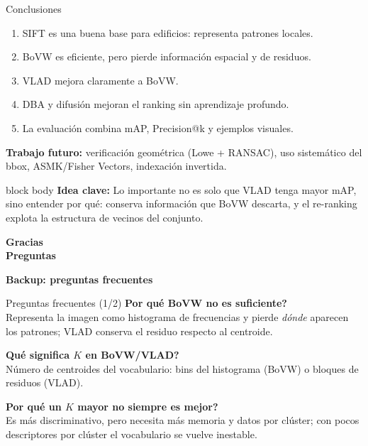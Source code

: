 \documentclass[aspectratio=169]{beamer}
\newcommand{\ideaclave}[1]{%
  \vfill
  \begin{beamercolorbox}[wd=\textwidth,sep=0.35em]{block body}
    \small\textbf{Idea clave:} #1
  \end{beamercolorbox}
}
\begin{document}
\begin{frame}{Conclusiones}
  \begin{enumerate}
    \item SIFT es una buena base para edificios: representa patrones locales.
    \item BoVW es eficiente, pero pierde informaci\'on espacial y de residuos.
    \item VLAD mejora claramente a BoVW.
    \item DBA y difusi\'on mejoran el ranking sin aprendizaje profundo.
    \item La evaluaci\'on combina mAP, Precision@k y ejemplos visuales.
  \end{enumerate}
  \vspace{0.5em}
  \textbf{Trabajo futuro:} verificaci\'on geom\'etrica (Lowe + RANSAC), uso sistem\'atico del bbox, ASMK/Fisher Vectors, indexaci\'on invertida.
  \ideaclave{Lo importante no es solo que VLAD tenga mayor mAP, sino entender por qu\'e: conserva informaci\'on que BoVW descarta, y el re-ranking explota la estructura de vecinos del conjunto.}
\end{frame}

\begin{frame}[plain]
  \begin{center}
    \Huge \textcolor{ProjBlue}{\textbf{Gracias}}\\[0.5em]
    \Large \textcolor{ProjBlue}{\textbf{Preguntas}}
  \end{center}
\end{frame}

{
\begin{frame}[plain]
  \begin{center}
    \Large\textbf{Backup: preguntas frecuentes}
  \end{center}
\end{frame}
}

\begin{frame}{Preguntas frecuentes (1/2)}
  \small
  \textbf{Por qu\'e BoVW no es suficiente?}\\
  Representa la imagen como histograma de frecuencias y pierde \emph{d\'onde} aparecen los patrones; VLAD conserva el residuo respecto al centroide.
  \vspace{0.4em}

  \textbf{Qu\'e significa $K$ en BoVW/VLAD?}\\
  N\'umero de centroides del vocabulario: bins del histograma (BoVW) o bloques de residuos (VLAD).
  \vspace{0.4em}

  \textbf{Por qu\'e un $K$ mayor no siempre es mejor?}\\
  Es m\'as discriminativo, pero necesita m\'as memoria y datos por cl\'uster; con pocos descriptores por cl\'uster el vocabulario se vuelve inestable.
\end{frame}
\end{document}
